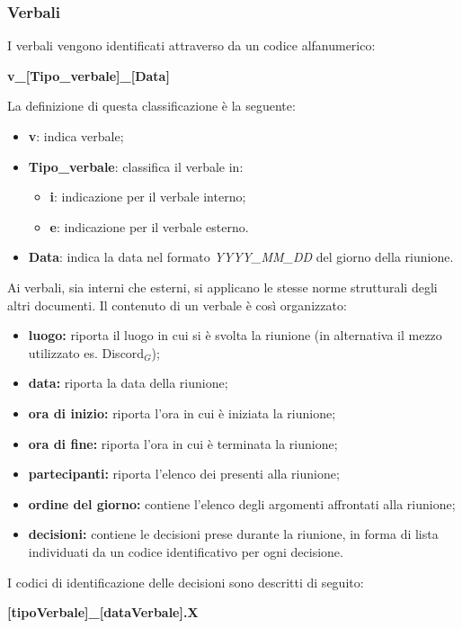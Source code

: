 \subsubsection{Verbali}\label{ProcessiDiSupportoDocumentazioneStrutturaGeneraleDeiDocumentiVerbali}
I verbali vengono identificati attraverso da un codice alfanumerico:
\begin{center}
	\textbf{v\_[Tipo\_verbale]\_[Data]}
\end{center}
La definizione di questa classificazione è la seguente:
\begin{itemize}
	\item \textbf{v}: indica verbale;
	\item \textbf{Tipo\_verbale}: classifica il verbale in:
		\begin{itemize}
			\item \textbf{i}: indicazione per il verbale interno;
			\item \textbf{e}: indicazione per il verbale esterno.
		\end{itemize}
	\item \textbf{Data}: indica la data nel formato \textit{YYYY\_MM\_DD} del giorno della riunione.
\end{itemize}
Ai verbali, sia interni che esterni, si applicano le stesse norme strutturali degli altri documenti. Il contenuto di un verbale è così organizzato:
\begin{itemize}
\item \textbf{luogo:} riporta il luogo in cui si è svolta la riunione (in alternativa il mezzo utilizzato es. Discord$_G$);
	\item \textbf{data:} riporta la data della riunione;
		\item \textbf{ora di inizio:} riporta l'ora in cui è iniziata la riunione;
			\item \textbf{ora di fine:} riporta l'ora in cui è terminata la riunione;
				\item \textbf{partecipanti:} riporta l'elenco dei presenti alla riunione;
					\item \textbf{ordine del giorno:} contiene l'elenco degli argomenti affrontati alla riunione;
						\item \textbf{decisioni:}  contiene le decisioni prese durante la riunione, in forma di lista individuati da un codice identificativo per ogni decisione.
\end{itemize}
I codici di identificazione delle decisioni sono descritti di seguito:
\begin{center}
	\textbf{[tipoVerbale]\_[dataVerbale].X}
\end{center}
